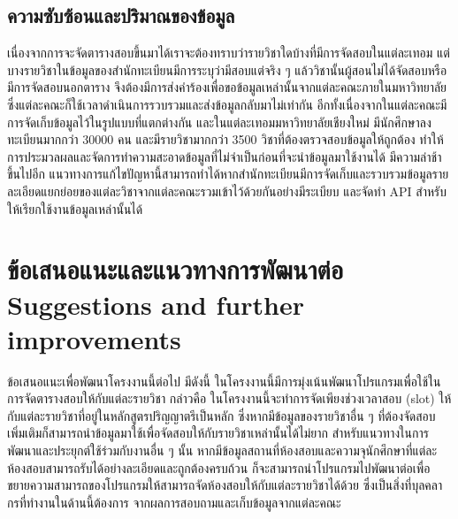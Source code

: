\subsection{ความซับซ้อนและปริมาณของข้อมูล}
เนื่องจากการจะจัดตารางสอบขึ้นมาได้เราจะต้องทราบว่ารายวิชาใดบ้างที่มีการจัดสอบในแต่ละเทอม 
แต่บางรายวิชาในข้อมูลของสำนักทะเบียนมีการระบุว่ามีสอบแต่จริง ๆ แล้ววิชานั้นผู้สอนไม่ได้จัดสอบหรือมีการจัดสอบนอกตาราง
จึงต้องมีการส่งคำร้องเพื่อขอข้อมูลเหล่านั้นจากแต่ละคณะภายในมหาวิทยาลัย ซึ่งแต่ละคณะก็ใช้เวลาดำเนินการรวบรวมและส่งข้อมูลกลับมาไม่เท่ากัน
อีกทั้งเนื่องจากในแต่ละคณะมีการจัดเก็บข้อมูลไว้ในรูปแบบที่แตกต่างกัน และในแต่ละเทอมมหาวิทยาลัยเชียงใหม่ 
มีนักศึกษาลงทะเบียนมากกว่า 30000 คน และมีรายวิชามากกว่า 3500 วิชาที่ต้องตรวจสอบข้อมูลให้ถูกต้อง
ทำให้การประมวลผลและจัดการทำความสะอาดข้อมูลที่ไม่จำเป็นก่อนที่จะนำข้อมูลมาใช้งานได้ มีความล่าช้าขึ้นไปอีก 
แนวทางการแก้ไขปัญหานี้สามารถทำได้หากสำนักทะเบียนมีการจัดเก็บและรวบรวมข้อมูลรายละเอียดแยกย่อยของแต่ละวิชาจากแต่ละคณะรวมเข้าไว้ด้วยกันอย่างมีระเบียบ
และจัดทำ API สำหรับให้เรียกใช้งานข้อมูลเหล่านั้นได้


\section{\ifcpe%
ข้อเสนอแนะและแนวทางการพัฒนาต่อ
\else%
Suggestions and further improvements
\fi
}

ข้อเสนอแนะเพื่อพัฒนาโครงงานนี้ต่อไป มีดังนี้
ในโครงงานนี้มีการมุ่งเน้นพัฒนาโปรแกรมเพื่อใช้ในการจัดตารางสอบให้กับแต่ละรายวิชา กล่าวคือ ในโครงงานนี้จะทำการจัดเพียงช่วงเวลาสอบ (slot)
ให้กับแต่ละรายวิชาที่อยู่ในหลักสูตรปริญญาตรีเป็นหลัก ซึ่งหากมีข้อมูลของรายวิชาอื่น ๆ ที่ต้องจัดสอบเพิ่มเติมก็สามารถนำข้อมูลมาใช้เพื่อจัดสอบให้กับรายวิชาเหล่านั้นได้ไม่ยาก
สำหรับแนวทางในการพัฒนาและประยุกต์ใช้ร่วมกับงานอื่น ๆ นั้น หากมีข้อมูลสถานที่ห้องสอบและความจุนักศึกษาที่แต่ละห้องสอบสามารถรับได้อย่างละเอียดและถูกต้องครบถ้วน
ก็จะสามารถนำโปรแกรมไปพัฒนาต่อเพื่อขยายความสามารถของโปรแกรมให้สามารถจัดห้องสอบให้กับแต่ละรายวิชาได้ด้วย ซึ่งเป็นสิ่งที่บุลคลากรที่ทำงานในด้านนี้ต้องการ จากผลการสอบถามและเก็บข้อมูลจากแต่ละคณะ